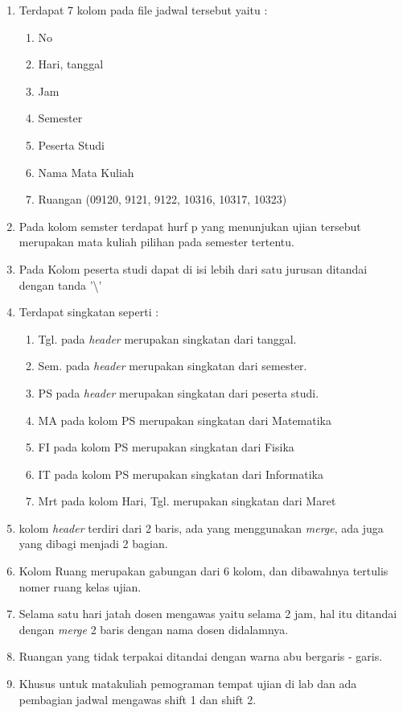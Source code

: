 \begin{enumerate}
	\item Terdapat 7 kolom pada file jadwal tersebut yaitu :
		\begin{enumerate}
			\item No
			\item Hari, tanggal
			\item Jam
			\item Semester
			\item Peserta Studi
			\item Nama Mata Kuliah
			\item Ruangan (09120, 9121, 9122, 10316, 10317, 10323)
		\end{enumerate}
	\item Pada kolom semster terdapat hurf p yang menunjukan ujian tersebut merupakan mata kuliah pilihan pada semester tertentu.
	\item Pada Kolom peserta studi dapat di isi lebih dari satu jurusan ditandai dengan tanda '\textbackslash'
	\item Terdapat singkatan seperti : 
		\begin{enumerate}
			\item Tgl. pada \textit{header} merupakan singkatan dari tanggal.
			\item Sem. pada \textit{header} merupakan singkatan dari semester.
			\item PS pada \textit{header} merupakan singkatan dari peserta studi.
			\item MA pada kolom PS merupakan singkatan dari Matematika
			\item FI pada kolom PS merupakan singkatan dari Fisika
			\item IT pada kolom PS merupakan singkatan dari Informatika
			\item Mrt pada kolom Hari, Tgl. merupakan singkatan dari Maret
		\end{enumerate}
	\item kolom \textit{header} terdiri dari 2 baris, ada yang menggunakan \textit{merge}, ada juga yang dibagi menjadi 2 bagian.
	\item Kolom Ruang merupakan gabungan dari 6 kolom, dan dibawahnya tertulis nomer ruang kelas ujian.
	\item Selama satu hari jatah dosen mengawas yaitu selama 2 jam, hal itu ditandai dengan \textit{merge} 2 baris dengan nama dosen didalamnya.
	\item Ruangan yang tidak terpakai ditandai dengan warna abu bergaris - garis.
	\item Khusus untuk matakuliah pemograman tempat ujian di lab dan ada pembagian jadwal mengawas shift 1 dan shift 2.
\end{enumerate} 
 
